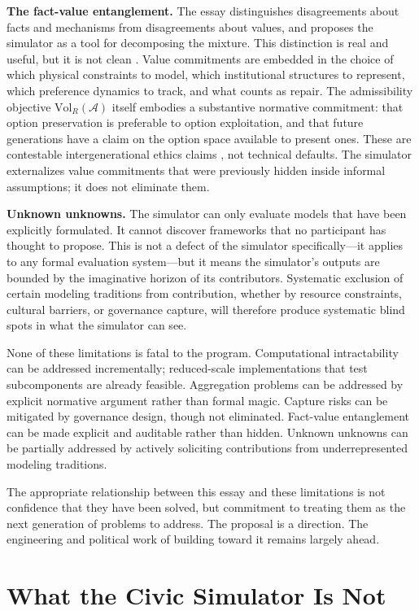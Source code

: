 \documentclass[12pt]{article}
\begin{document}
\textbf{The fact-value entanglement.} The essay distinguishes disagreements about facts and mechanisms from disagreements about values, and proposes the simulator as a tool for decomposing the mixture. This distinction is real and useful, but it is not clean \cite{putnam2002}. Value commitments are embedded in the choice of which physical constraints to model, which institutional structures to represent, which preference dynamics to track, and what counts as repair. The admissibility objective $\mathrm{Vol}_R(\mathcal{A})$ itself embodies a substantive normative commitment: that option preservation is preferable to option exploitation, and that future generations have a claim on the option space available to present ones. These are contestable intergenerational ethics claims \cite{rawls1971}, not technical defaults. The simulator externalizes value commitments that were previously hidden inside informal assumptions; it does not eliminate them.

\textbf{Unknown unknowns.} The simulator can only evaluate models that have been explicitly formulated. It cannot discover frameworks that no participant has thought to propose. This is not a defect of the simulator specifically---it applies to any formal evaluation system---but it means the simulator's outputs are bounded by the imaginative horizon of its contributors. Systematic exclusion of certain modeling traditions from contribution, whether by resource constraints, cultural barriers, or governance capture, will therefore produce systematic blind spots in what the simulator can see.

None of these limitations is fatal to the program. Computational intractability can be addressed incrementally; reduced-scale implementations that test subcomponents are already feasible. Aggregation problems can be addressed by explicit normative argument rather than formal magic. Capture risks can be mitigated by governance design, though not eliminated. Fact-value entanglement can be made explicit and auditable rather than hidden. Unknown unknowns can be partially addressed by actively soliciting contributions from underrepresented modeling traditions.

The appropriate relationship between this essay and these limitations is not confidence that they have been solved, but commitment to treating them as the next generation of problems to address. The proposal is a direction. The engineering and political work of building toward it remains largely ahead.

\section{What the Civic Simulator Is Not}
\end{document}
